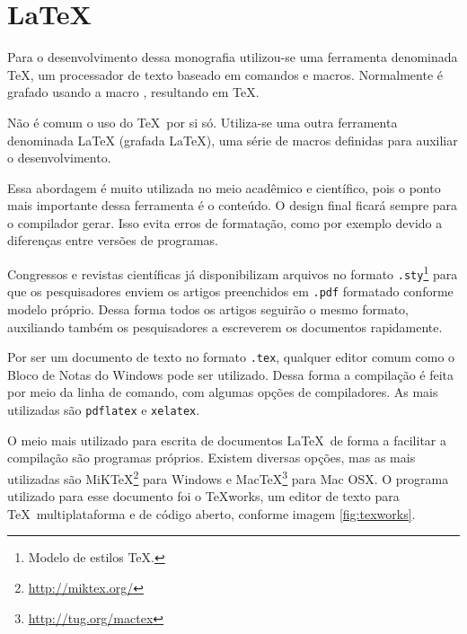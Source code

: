 
\chapter{LaTeX}\label{ap:latex}

Para o desenvolvimento dessa monografia utilizou-se uma ferramenta denominada TeX, um processador de texto baseado em comandos e macros. Normalmente é grafado usando a macro \texttt{\detokenize{\TeX}}, resultando em \TeX. 

Não é comum o uso do \TeX\ por si só. Utiliza-se uma outra ferramenta denominada LaTeX (grafada \LaTeX), uma série de macros definidas para auxiliar o desenvolvimento.

Essa abordagem é muito utilizada no meio acadêmico e científico, pois o ponto mais importante dessa ferramenta é o conteúdo. O design final ficará sempre para o compilador gerar. Isso evita erros de formatação, como por exemplo devido a diferenças entre versões de programas.

Congressos e revistas científicas já disponibilizam arquivos no formato \texttt{.sty}\footnote{Modelo de estilos \TeX.} para que os pesquisadores enviem os artigos preenchidos em \texttt{.pdf} formatado conforme modelo próprio. Dessa forma todos os artigos seguirão o mesmo formato, auxiliando também os pesquisadores a escreverem os documentos rapidamente.

Por ser um documento de texto no formato \texttt{.tex}, qualquer editor comum como o Bloco de Notas do Windows pode ser utilizado. Dessa forma a compilação é feita por meio da linha de comando, com algumas opções de compiladores. As mais utilizadas são \texttt{pdflatex} e \texttt{xelatex}.

O meio mais utilizado para escrita de documentos \LaTeX\ de forma a facilitar a compilação são programas próprios. Existem diversas opções, mas as mais utilizadas são MiKTeX\footnote{\url{http://miktex.org/}} para Windows e MacTeX\footnote{\url{http://tug.org/mactex}} para Mac OSX. O programa utilizado para esse documento foi o TeXworks, um editor de texto para \TeX\ multiplataforma e de código aberto, conforme imagem \ref{fig:texworks}.


